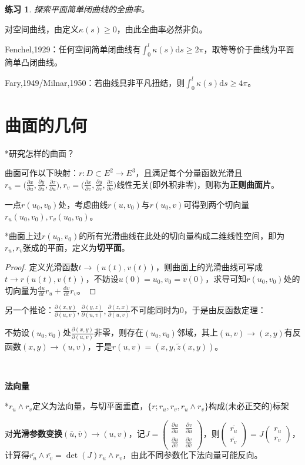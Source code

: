 \documentclass[a4paper,UTF8,fontset=windows]{ctexart}
\newtheorem*{hw}{练习}
\begin{document}
\begin{hw}
探索平面简单闭曲线的全曲率。
\end{hw}

对空间曲线，由定义$\kappa(s)\ge0$，由此全曲率必然非负。

Fenchel,1929：任何空间简单闭曲线有$\int_0^l\kappa(s)\mathrm{d}s\ge2\pi$，取等等价于曲线为平面简单凸闭曲线。

Fary,1949/Milnar,1950：若曲线具非平凡扭结，则$\int_0^l\kappa(s)\mathrm{d}s\ge4\pi$。

\section{曲面的几何}

*研究怎样的曲面？

曲面可作以下映射：$r:D\subset E^2\to E^3$，且满足每个分量函数光滑且$r_u=\big(\frac{\partial x}{\partial u},\frac{\partial y}{\partial u},\frac{\partial z}{\partial u}\big),r_v=\big(\frac{\partial x}{\partial v},\frac{\partial y}{\partial v},\frac{\partial z}{\partial v}\big)$线性无关(即外积非零)，则称为\textbf{正则曲面片}。

一点$r(u_0,v_0)$处，考虑曲线$r(u,v_0)$与$r(u_0,v)$可得到两个切向量$r_u(u_0,v_0),r_v(u_0,v_0)$。

*曲面上过$r(u_0,v_0)$的所有光滑曲线在此处的切向量构成二维线性空间，即为$r_u,r_v$张成的平面，定义为\textbf{切平面}。

\begin{proof}
定义光滑函数$t\to (u(t),v(t))$，则曲面上的光滑曲线可写成$t\to r(u(t),v(t))$，不妨设$u(0)=u_0,v_0=v(0)$，求导可知$r(u_0,v_0)$处的切向量为$\frac{\mathrm{d}u}{\mathrm{d}t}r_u+\frac{\mathrm{d}v}{\mathrm{d}t}r_v$。
\end{proof}

另一个推论：$\frac{\partial(x,y)}{\partial(u,v)},\frac{\partial(y,z)}{\partial(u,v)},\frac{\partial(z,x)}{\partial(u,v)}$不可能同时为0，于是由反函数定理：

不妨设$(u_0,v_0)$处$\frac{\partial(x,y)}{\partial(u,v)}$非零，则存在$(u_0,v_0)$邻域，其上$(u,v)\to(x,y)$有反函数$(x,y)\to(u,v)$，于是$r(u,v)=(x,y,\tilde{z}(x,y))$。

\

\textbf{法向量}

*$r_u\wedge r_v$定义为法向量，与切平面垂直，$\{r;r_u,r_v,r_u\wedge r_v\}$构成(未必正交的)标架

对\textbf{光滑参数变换}$(\bar{u},\bar{v})\to(u,v)$，记$J=\begin{pmatrix}\frac{\partial u}{\partial\bar{u}}&\frac{\partial v}{\partial\bar{u}}\\\frac{\partial u}{\partial\bar{v}}&\frac{\partial v}{\partial\bar{v}}\end{pmatrix}$，则$\begin{pmatrix}\overline{r_u}\\\overline{r_v}\end{pmatrix}=J\begin{pmatrix}r_u\\r_v\end{pmatrix}$，计算得$\overline{r_u}\wedge\overline{r_v}=\det(J)r_u\wedge r_v$，由此不同参数化下法向量可能反向。
\end{document}
